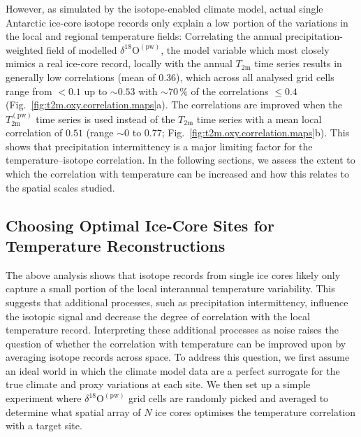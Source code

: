\documentclass[draft]{agujournal2019}
\begin{document}
However, as simulated by the isotope-enabled climate model, actual single
Antarctic ice-core isotope records only explain a low portion of the variations
in the local and regional temperature fields: Correlating the annual
precipitation-weighted field of modelled
$\delta^{18}\mathrm{O}^{\mathrm{(pw)}}$, the model variable which most closely
mimics a real ice-core record, locally with the annual $T_{2\mathrm{m}}$ time
series results in generally low correlations (mean of $0.36$), which across all
analysed grid cells range from $<0.1$ up to $\sim0.53$ with $\sim70\,\%$ of the
correlations $\leq0.4$ (Fig.~\ref{fig:t2m.oxy.correlation.maps}a). The
correlations are improved when the $T_{2\mathrm{m}}^{\mathrm{(pw)}}$ time series
is used instead of the $T_{2\mathrm{m}}$ time series with a mean local
correlation of $0.51$ (range $\sim0$ to $0.77$;
Fig.~\ref{fig:t2m.oxy.correlation.maps}b). This shows that precipitation
intermittency is a major limiting factor for the temperature--isotope
correlation. In the following sections, we assess the extent to which the
correlation with temperature can be increased and how this relates to the
spatial scales studied.

\subsection{Choosing Optimal Ice-Core Sites for Temperature Reconstructions}
\label{results:picking}

The above analysis shows that isotope records from single ice cores likely only
capture a small portion of the local interannual temperature variability. This
suggests that additional processes, such as precipitation intermittency,
influence the isotopic signal and decrease the degree of correlation with the
local temperature record. Interpreting these additional processes as noise
raises the question of whether the correlation with temperature can be improved
upon by averaging isotope records across space. To address this question, we
first assume an ideal world in which the climate model data are a perfect
surrogate for the true climate and proxy variations at each site. We then set up
a simple experiment where $\delta^{18}\mathrm{O}^{\mathrm{(pw)}}$ grid cells are
randomly picked and averaged to determine what spatial array of $N$ ice cores
optimises the temperature correlation with a target site.
\end{document}

